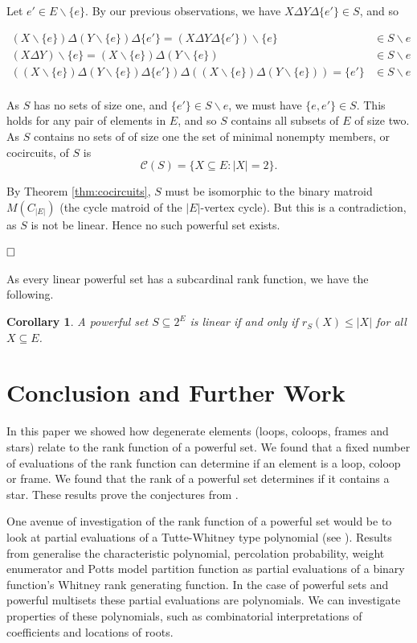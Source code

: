 \documentclass[10pt]{article}
\newtheorem{cor}[thm]{Corollary}
\theoremstyle{definition}
\begin{document}
Let $e'\in E\backslash\{e\}$. By our previous observations, we have $X\Delta Y \Delta \{e'\}\in S$, and so 
	
	\[\begin{array}{rl}
(X\backslash \{e\} )\Delta (Y\backslash \{e\} ) \Delta \{e'\}=	(X\Delta Y \Delta \{e'\})\backslash \{e\}&\in S\backslash e\\
	(X\Delta Y)\backslash \{e\} =(X\backslash \{e\}) \Delta (Y\backslash \{e\}) &\in S\backslash e\\
	((X\backslash \{e\} )\Delta (Y\backslash \{e\}) \Delta \{e'\})\Delta((X\backslash \{e\}) \Delta (Y\backslash \{e\}))=\{e'\} &\in S\backslash e\\
	\end{array}	\]
	
	
	As $S$ has no sets of size one, and $\{e'\}\in S\backslash e$, we must have $\{e,e'\}\in S$. This holds for any pair of elements in $E$, and so $S$ contains all subsets of $E$ of size two.  As $S$ contains no sets of  of size one the set of minimal nonempty members, or cocircuits, of $S$ is
	\[	\mathcal{C}(S)=\{X\subseteq E:|X|=2\}.	\]
	
	By Theorem \ref{thm:cocircuits}, $S$ must be isomorphic to the binary matroid $M(C_{|E|})$ (the cycle matroid of the $|E|$-vertex cycle). But this is a contradiction, as $S$ is not be linear. Hence no such powerful set exists. 
		
	$\hfill\Box$
	
As every linear powerful set has a subcardinal rank function, we have the following.
\begin{cor}
	A powerful set $S\subseteq 2^E$ is linear if and only if $r_S(X)\leq |X|$ for all $X\subseteq E$.
	\end{cor}
	
	\section{Conclusion and Further Work}

    In this paper we showed how degenerate elements (loops, coloops, frames and stars) relate to the rank function of a powerful set. We found that a fixed number of evaluations of the rank function can determine if an element is a loop, coloop or frame. We found that the rank of a powerful set determines if it contains a star.
    These results prove the conjectures from \cite{farr2017}.
	
	One avenue of investigation of the rank function of a powerful set would be to look at partial evaluations of a Tutte-Whitney type polynomial (see \cite{ellis2011}).  Results from \cite{farr93,farr04} generalise the characteristic polynomial, percolation probability, weight enumerator and Potts model partition function as partial evaluations of a binary function's Whitney rank generating function. In the case of powerful sets and powerful multisets these partial evaluations are polynomials. We can investigate properties of these polynomials, such as combinatorial interpretations of coefficients and locations of roots.
\end{document}
